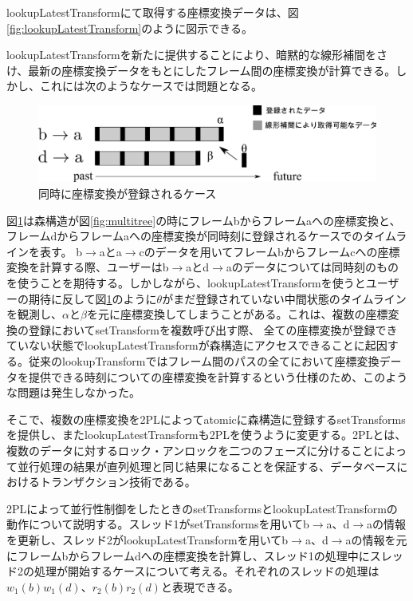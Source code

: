 \documentclass[a4paper]{jreport}	%
\begin{document}
lookupLatestTransformにて取得する座標変換データは、図\ref{fig:lookupLatestTransform}のように図示できる。

lookupLatestTransformを新たに提供することにより、暗黙的な線形補間をさけ、最新の座標変換データをもとにしたフレーム間の座標変換が計算できる。しかし、これには次のようなケースでは問題となる。

\begin{figure}[h] 
\centering
\includegraphics[width=12cm]{coming-same-time}
\caption{同時に座標変換が登録されるケース}
\label{fig:coming-same-time}
\end{figure}


図\ref{fig:coming-same-time}は森構造が図\ref{fig:multitree}の時にフレームbからフレームaへの座標変換と、フレームdからフレームaへの座標変換が同時刻に登録されるケースでのタイムラインを表す。
b$\rightarrow$aとa$\rightarrow$cのデータを用いてフレームbからフレームcへの座標変換を計算する際、ユーザーはb$\rightarrow$aとd$\rightarrow$aのデータについては同時刻のものを使うことを期待する。しかしながら、lookupLatestTransformを使うとユーザーの期待に反して図\ref{fig:coming-same-time}のように$\theta$がまだ登録されていない中間状態のタイムラインを観測し、$\alpha$と$\beta$を元に座標変換してしまうことがある。これは、複数の座標変換の登録においてsetTransformを複数呼び出す際、 全ての座標変換が登録できていない状態でlookupLatestTransformが森構造にアクセスできることに起因する。従来のlookupTransformではフレーム間のパスの全てにおいて座標変換データを提供できる時刻についての座標変換を計算するという仕様のため、このような問題は発生しなかった。


そこで、複数の座標変換を2PLによってatomicに森構造に登録するsetTransformsを提供し、またlookupLatestTransformも2PLを使うように変更する。2PL\cite{2PL}とは、複数のデータに対するロック・アンロックを二つのフェーズに分けることによって並行処理の結果が直列処理と同じ結果になることを保証する、データベースにおけるトランザクション技術である。

2PLによって並行性制御をしたときのsetTransformsとlookupLatestTransformの動作について説明する。スレッド1がsetTransformsを用いてb$\rightarrow$a、d$\rightarrow$aの情報を更新し、スレッド2がlookupLatestTransformを用いてb$\rightarrow$a、d$\rightarrow$aの情報を元にフレームbからフレームdへの座標変換を計算し、スレッド1の処理中にスレッド2の処理が開始するケースについて考える。それぞれのスレッドの処理は$w_1(b)w_1(d)$、$r_2(b)r_2(d)$と表現できる。
\end{document}
